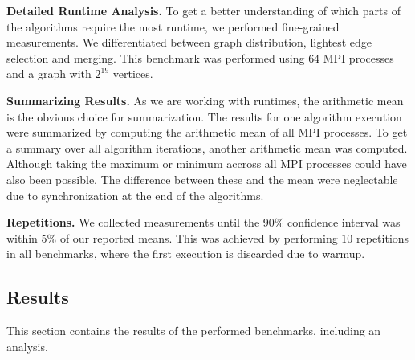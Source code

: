 \documentclass[letterpaper]{article}
\newcommand{\mypar}[1]{{\bf #1.}}
\begin{document}
\mypar{Detailed Runtime Analysis}
To get a better understanding of which parts of the algorithms require the most runtime, we performed fine-grained
measurements. We differentiated between graph distribution, lightest edge selection and merging. This benchmark was
performed using $64$ MPI processes and a graph with $2^{19}$ vertices.

\mypar{Summarizing Results}
As we are working with runtimes, the arithmetic mean is the obvious choice for summarization. The results for one
algorithm execution were summarized by computing the arithmetic mean of all MPI processes. To get a summary over all
algorithm iterations, another arithmetic mean was computed. Although taking the maximum or minimum accross all MPI
processes could have also been possible. The difference between these and the mean were neglectable due to
synchronization at the end of the algorithms. %

\mypar{Repetitions}
We collected measurements until the $90\%$ confidence interval was within $5\%$ of our reported means. This was achieved
by performing $10$ repetitions in all benchmarks, where the first execution is discarded due to warmup.

\subsection{Results}
\label{sec:results}
This section contains the results of the performed benchmarks, including an analysis.



% 
\end{document}
